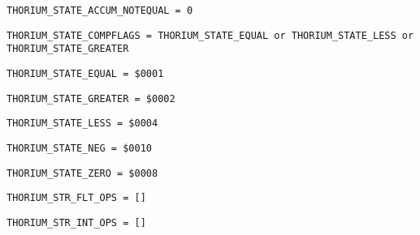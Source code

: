 \begin{verbatim}
THORIUM_STATE_ACCUM_NOTEQUAL = 0
\end{verbatim}
\label{thoriumcore:thorium:thoriumstateaccumnotequal}



\begin{verbatim}
THORIUM_STATE_COMPFLAGS = THORIUM_STATE_EQUAL or THORIUM_STATE_LESS or THORIUM_STATE_GREATER
\end{verbatim}
\label{thoriumcore:thorium:thoriumstatecompflags}



\begin{verbatim}
THORIUM_STATE_EQUAL = $0001
\end{verbatim}
\label{thoriumcore:thorium:thoriumstateequal}



\begin{verbatim}
THORIUM_STATE_GREATER = $0002
\end{verbatim}
\label{thoriumcore:thorium:thoriumstategreater}



\begin{verbatim}
THORIUM_STATE_LESS = $0004
\end{verbatim}
\label{thoriumcore:thorium:thoriumstateless}



\begin{verbatim}
THORIUM_STATE_NEG = $0010
\end{verbatim}
\label{thoriumcore:thorium:thoriumstateneg}



\begin{verbatim}
THORIUM_STATE_ZERO = $0008
\end{verbatim}
\label{thoriumcore:thorium:thoriumstatezero}



\begin{verbatim}
THORIUM_STR_FLT_OPS = []
\end{verbatim}
\label{thoriumcore:thorium:thoriumstrfltops}



\begin{verbatim}
THORIUM_STR_INT_OPS = []
\end{verbatim}
\label{thoriumcore:thorium:thoriumstrintops}



